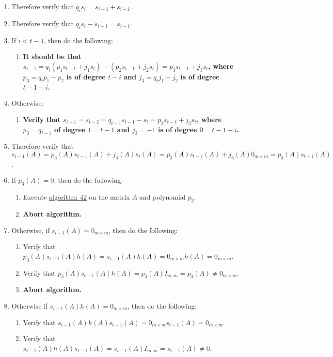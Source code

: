 \documentclass[twocolumn]{article}
\begin{document}
\begin{enumerate}
\begin{enumerate}
					\item Therefore verify that $q_is_i=s_{i+1}+s_{i-1}$.
					\item Therefore verify that $q_is_i-s_{i+1}=s_{i-1}$.
					\item If $i<t-1$, then do the following:
					\begin{enumerate}
						\item \textbf{It should be that $s_{i-1}=q_i(p_1s_{t-1}+j_1s_t)-(p_2s_{t-1}+j_2s_t)=p_3s_{t-1}+j_3s_t$, where $p_3=q_ip_1-p_2$ is of degree $t-i$ and $j_3=q_ij_1-j_2$ is of degree $t-1-i$.}
					\end{enumerate}
					\item Otherwise:
					\begin{enumerate}
						\item \textbf{Verify that $s_{i-1}=s_{t-2}=q_{t-1}s_{t-1}-s_t=p_3s_{t-1}+j_3s_t$, where $p_3=q_{t-1}$ of degree $1=t-1$ and $j_3=-1$ is of degree $0=t-1-i$.}
					\end{enumerate}
					\item Therefore verify that $s_{i-1}(A)=p_3(A)s_{t-1}(A)+j_3(A)s_t(A)=p_3(A)s_{t-1}(A)+j_3(A)0_{m\times m}=p_3(A)s_{t-1}(A)$.
					\item If $p_3(A)=0$, then do the following:
					\begin{enumerate}
						\item Execute \hyperref[sec:algorithm 42]{algorithm 42} on the matrix $A$ and polynomial $p_3$.
						\item \textbf{Abort algorithm.}
					\end{enumerate}
					\item Otherwise, if $s_{i-1}(A)=0_{m\times m}$, then do the following:
					\begin{enumerate}
						\item Verify that $p_3(A)s_{t-1}(A)h(A)=s_{i-1}(A)h(A)=0_{m\times m}h(A)=0_{m\times m}$.
						\item Verify that $p_3(A)s_{t-1}(A)h(A)=p_3(A)I_{m,m}=p_3(A)\ne0_{m\times m}$.
						\item \textbf{Abort algorithm.}
					\end{enumerate}
					\item Otherwise if $s_{i-1}(A)h(A)=0_{m\times m}$, then do the following:
					\begin{enumerate}
						\item Verify that $s_{i-1}(A)h(A)s_{t-1}(A)=0_{m\times m}s_{t-1}(A)=0_{m\times m}$.
						\item Verify that $s_{i-1}(A)h(A)s_{t-1}(A)=s_{i-1}(A)I_{m,m}=s_{i-1}(A)\ne 0$.

\end{enumerate}
\end{enumerate}
\end{enumerate}
\end{document}

